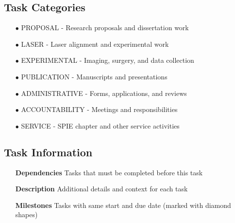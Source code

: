 \documentclass[landscape,a4paper]{article}
\begin{document}
\subsection{Task Categories}
\begin{itemize}[leftmargin=2cm]
    \item[\textcolor{researchcore}{$\bullet$}] PROPOSAL - Research proposals and dissertation work
    \item[\textcolor{researchexp}{$\bullet$}] LASER - Laser alignment and experimental work
    \item[\textcolor{researchexp}{$\bullet$}] EXPERIMENTAL - Imaging, surgery, and data collection
    \item[\textcolor{researchout}{$\bullet$}] PUBLICATION - Manuscripts and presentations
    \item[\textcolor{administrative}{$\bullet$}] ADMINISTRATIVE - Forms, applications, and reviews
    \item[\textcolor{accountability}{$\bullet$}] ACCOUNTABILITY - Meetings and responsibilities
    \item[\textcolor{service}{$\bullet$}] SERVICE - SPIE chapter and other service activities
\end{itemize}

\subsection{Task Information}
\begin{itemize}[leftmargin=2cm]
    \item[\textbf{Dependencies}] Tasks that must be completed before this task
    \item[\textbf{Description}] Additional details and context for each task
    \item[\textbf{Milestones}] Tasks with same start and due date (marked with diamond shapes)
\end{itemize}
\end{document}
